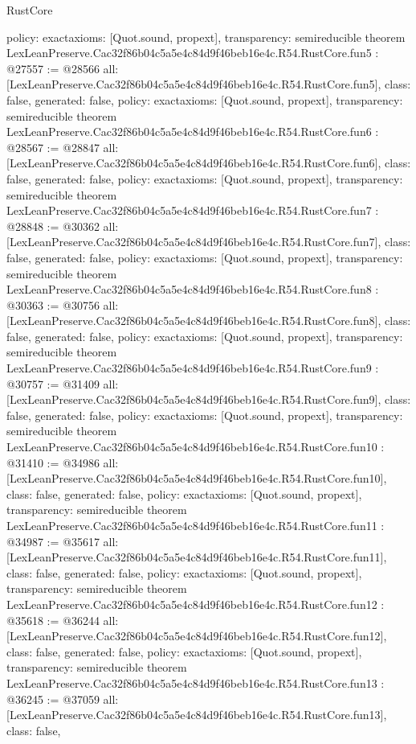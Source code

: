 \begin{lexlean}{RustCore}
\begin{coremodule}
{  policy: exact{axioms: [Quot.sound, propext]},
  transparency: semireducible
}
theorem LexLeanPreserve.Cac32f86b04c5a5e4c84d9f46beb16e4c.R54.RustCore.fun5 : @27557 := @28566 {
  all: [LexLeanPreserve.Cac32f86b04c5a5e4c84d9f46beb16e4c.R54.RustCore.fun5],
  class: false,
  generated: false,
  policy: exact{axioms: [Quot.sound, propext]},
  transparency: semireducible
}
theorem LexLeanPreserve.Cac32f86b04c5a5e4c84d9f46beb16e4c.R54.RustCore.fun6 : @28567 := @28847 {
  all: [LexLeanPreserve.Cac32f86b04c5a5e4c84d9f46beb16e4c.R54.RustCore.fun6],
  class: false,
  generated: false,
  policy: exact{axioms: [Quot.sound, propext]},
  transparency: semireducible
}
theorem LexLeanPreserve.Cac32f86b04c5a5e4c84d9f46beb16e4c.R54.RustCore.fun7 : @28848 := @30362 {
  all: [LexLeanPreserve.Cac32f86b04c5a5e4c84d9f46beb16e4c.R54.RustCore.fun7],
  class: false,
  generated: false,
  policy: exact{axioms: [Quot.sound, propext]},
  transparency: semireducible
}
theorem LexLeanPreserve.Cac32f86b04c5a5e4c84d9f46beb16e4c.R54.RustCore.fun8 : @30363 := @30756 {
  all: [LexLeanPreserve.Cac32f86b04c5a5e4c84d9f46beb16e4c.R54.RustCore.fun8],
  class: false,
  generated: false,
  policy: exact{axioms: [Quot.sound, propext]},
  transparency: semireducible
}
theorem LexLeanPreserve.Cac32f86b04c5a5e4c84d9f46beb16e4c.R54.RustCore.fun9 : @30757 := @31409 {
  all: [LexLeanPreserve.Cac32f86b04c5a5e4c84d9f46beb16e4c.R54.RustCore.fun9],
  class: false,
  generated: false,
  policy: exact{axioms: [Quot.sound, propext]},
  transparency: semireducible
}
theorem LexLeanPreserve.Cac32f86b04c5a5e4c84d9f46beb16e4c.R54.RustCore.fun10 : @31410 := @34986 {
  all: [LexLeanPreserve.Cac32f86b04c5a5e4c84d9f46beb16e4c.R54.RustCore.fun10],
  class: false,
  generated: false,
  policy: exact{axioms: [Quot.sound, propext]},
  transparency: semireducible
}
theorem LexLeanPreserve.Cac32f86b04c5a5e4c84d9f46beb16e4c.R54.RustCore.fun11 : @34987 := @35617 {
  all: [LexLeanPreserve.Cac32f86b04c5a5e4c84d9f46beb16e4c.R54.RustCore.fun11],
  class: false,
  generated: false,
  policy: exact{axioms: [Quot.sound, propext]},
  transparency: semireducible
}
theorem LexLeanPreserve.Cac32f86b04c5a5e4c84d9f46beb16e4c.R54.RustCore.fun12 : @35618 := @36244 {
  all: [LexLeanPreserve.Cac32f86b04c5a5e4c84d9f46beb16e4c.R54.RustCore.fun12],
  class: false,
  generated: false,
  policy: exact{axioms: [Quot.sound, propext]},
  transparency: semireducible
}
theorem LexLeanPreserve.Cac32f86b04c5a5e4c84d9f46beb16e4c.R54.RustCore.fun13 : @36245 := @37059 {
  all: [LexLeanPreserve.Cac32f86b04c5a5e4c84d9f46beb16e4c.R54.RustCore.fun13],
  class: false,
}
\end{coremodule}
\end{lexlean}
